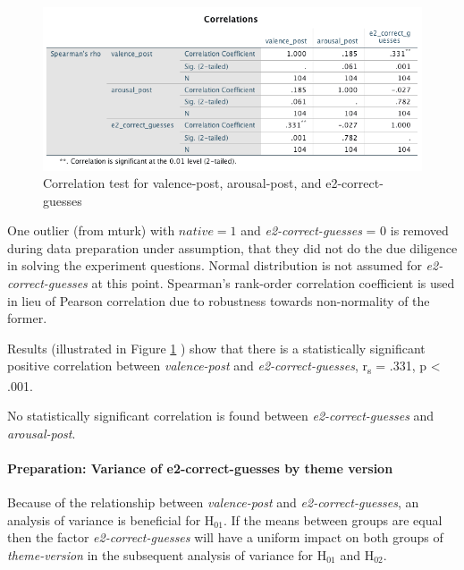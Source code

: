 	\begin{figure}
		\centering
		\includegraphics[width=1\linewidth]{graphics/correlationE2-correct-guesses-affect-post}
		\caption{Correlation test for valence-post, arousal-post, and e2-correct-guesses}
		\label{fig:correlatione2-correct-guesses-affect-post}
	\end{figure}
	
	One outlier (from mturk) with \(native = 1\) and \textit{e2-correct-guesses} = 0 is removed during data preparation under assumption, that they did not do the due diligence in solving the experiment questions. Normal distribution is not assumed for \textit{e2-correct-guesses} at this point. Spearman's rank-order correlation coefficient is used in lieu of Pearson correlation due to robustness towards non-normality of the former.
	
	
	Results (illustrated in Figure \ref{fig:correlatione2-correct-guesses-affect-post} ) show that there is a statistically significant positive correlation between \textit{valence-post} and \textit{e2-correct-guesses}, r\textsubscript{s} = .331, p < .001.
	
	No statistically significant correlation is found between \textit{e2-correct-guesses} and \textit{arousal-post}.
	
	\paragraph{Preparation: Variance of e2-correct-guesses by theme version}
	
	Because of the relationship between \textit{valence-post} and \textit{e2-correct-guesses}, an analysis of variance is beneficial for H$_{01}$. If the means between groups are equal then the factor \textit{e2-correct-guesses} will have a uniform impact on both groups of \textit{theme-version} in the subsequent analysis of variance for H$_{01}$ and H$_{02}$.
	
